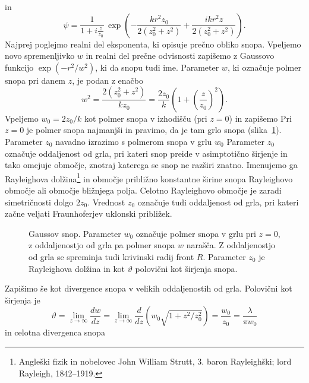 in
\begin{equation}
 \psi = \frac{1}{1+i\frac{z}{z_{0}}}\,\exp\left(-\frac{kr^{2}z_{0}}{2(z_{0}^{2}+z^{2})}+
 \frac{ikr^{2}z}{2(z_{0}^{2}+z^{2})}\right).
 \label{eq:gaussov-snop-vmesni}
\end{equation}
Najprej poglejmo realni del eksponenta, ki opisuje prečno obliko snopa. Vpeljemo novo spremenljivko $w$
in realni del prečne odvisnosti zapišemo z Gaussovo funkcijo $\exp(-r^2/w^2)$, 
ki da snopu tudi ime. Parameter $w$, ki označuje 
polmer snopa pri danem $z$, je podan z enačbo 
\begin{equation}
w^2 = \frac{2(z_0^2+z^2)}{kz_0}= \frac{2z_0}{k}\left(1+\left(\frac{z}{z_0}\right)^2\right).
\end{equation}
Vpeljemo $w_0 = 2z_0/k$ kot polmer snopa v izhodišču (pri $z=0$) in zapišemo
Pri $z=0$ je polmer snopa najmanjši in pravimo, da je tam grlo snopa 
(slika~\ref{fig:Gauss}). Parameter $z_0$ 
navadno izrazimo s polmerom snopa v grlu $w_0$
Parameter $z_{0}$ označuje oddaljenost od grla, 
pri kateri snop preide v asimptotično širjenje in tako omejuje območje,
znotraj katerega se snop ne razširi znatno. Imenujemo ga 
Rayleighova dolžina\footnote{Angleški fizik in 
nobelovec John William Strutt, 3. baron Rayleighški; lord Rayleigh, 1842--1919.}
in območje približno konstantne širine snopa Rayleighovo
območje ali območje bližnjega 
polja. Celotno Rayleighovo 
območje je zaradi simetričnosti dolgo $2z_0$. 
Vrednost $z_{0}$ označuje tudi oddaljenost od grla, pri kateri začne veljati 
Fraunhoferjev uklonski približek. 
\begin{figure}[h]
\centering
\def\svgwidth{100truemm} 

\caption{Gaussov snop. Parameter $w_0$ označuje polmer snopa v grlu pri $z=0$, z oddaljenostjo
od grla pa polmer snopa $w$ narašča. Z oddaljenostjo od grla se spreminja tudi krivinski radij front $R$.
Parameter $z_0$ je Rayleighova dolžina in kot $\vartheta$ polovični kot širjenja snopa.}
\label{fig:Gauss}
\end{figure}

Zapišimo še kot divergence snopa v velikih oddaljenostih od grla. Polovični kot širjenja je
\begin{equation}
\vartheta=\lim_{z \to \infty} \frac{dw}{dz} = \lim_{z \to \infty}\frac{d}{dz} \left(w_0\sqrt{1+z^2/z_0^2}\right)=
\frac{w_{0}}{z_{0}}= \frac{\lambda}{\pi w_{0}}\label{eq:divergenca-snopa}
\end{equation}
in celotna divergenca snopa

